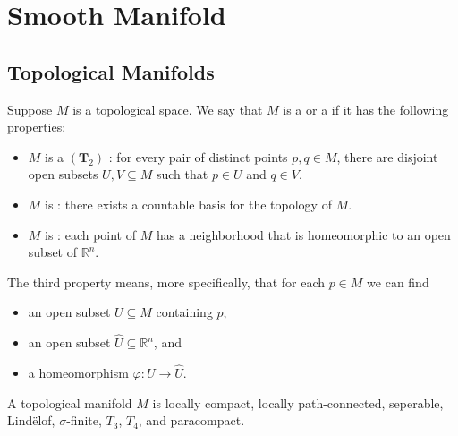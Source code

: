 \documentclass[../main.tex]{subfiles}
\begin{document}
\ifSubfilesClassLoaded{

    \tableofcontents
    
}{}

\chapter{ Smooth Manifold }


\section{Topological Manifolds}

\begin{definition}{}{}
    Suppose $M$ is a topological space. We say that $M$ is a  or a  if it has the following properties:

\begin{itemize}
\item $M$ is a \(  (\mathbf{T}_{2})  \) : for every pair of distinct points $p, q \in M$, there are disjoint open subsets $U, V \subseteq M$ such that $p \in U$ and $q \in V$.
\item $M$ is : there exists a countable basis for the topology of $M$.
\item $M$ is : each point of $M$ has a neighborhood that is homeomorphic to an open subset of $\mathbb{R}^n$.
\end{itemize}
\end{definition}

\begin{remark}
    The third property means, more specifically, that for each $p \in M$ we can find
\begin{itemize}
    \item an open subset $U \subseteq M$ containing $p$,
    \item an open subset $\hat{U} \subseteq \mathbb{R}^n$, and
    \item a homeomorphism $\varphi: U \to \hat{U}$.
\end{itemize}
\end{remark}

\begin{remark}
    A topological manifold \(  M  \) is locally compact, locally path-connected, seperable, Lind\"elof, \(   \sigma   \)-finite, \(  T_3  \), \(  T_4  \), and paracompact.    
\end{remark}
\end{document}
